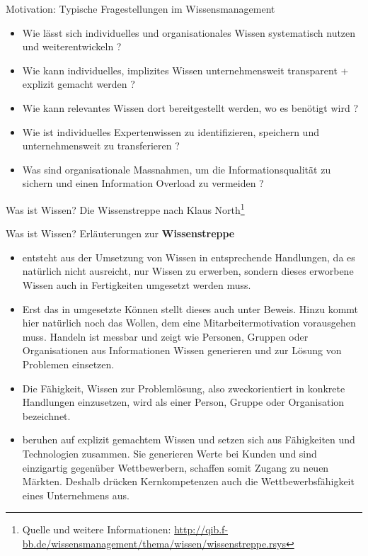 \documentclass[aspectratio=1610,onlymath]{beamer}
\begin{document}
\begin{frame}{Motivation: Typische Fragestellungen im Wissensmanagement}
\begin{itemize}
	\item Wie lässt sich \alert{individuelles und organisationales} Wissen \alert{systematisch} nutzen und weiterentwickeln ?
	\item Wie kann individuelles, implizites Wissen unternehmensweit \alert{transparent + explizit} gemacht werden ?
	\item Wie kann relevantes Wissen dort \alert{bereitgestellt} werden, wo es benötigt wird ?
	\item Wie ist individuelles Expertenwissen zu identifizieren, speichern und unternehmensweit zu \alert{transferieren} ?
	\item Was sind organisationale Massnahmen, um die \alert{Informationsqualität} zu sichern und einen Information Overload zu vermeiden ?
\end{itemize}
\end{frame}


\begin{frame}{Was ist Wissen?}
Die Wissenstreppe nach Klaus North\footnote{Quelle und weitere Informationen: \url{http://qib.f-bb.de/wissensmanagement/thema/wissen/wissenstreppe.rsys}}
\end{frame}


\begin{frame}{Was ist Wissen?}
Erläuterungen zur \textbf{Wissenstreppe}
\begin{itemize}
\item {} entsteht aus der Umsetzung von Wissen in entsprechende Handlungen, da es natürlich nicht ausreicht, nur Wissen zu erwerben, sondern dieses erworbene Wissen auch in Fertigkeiten umgesetzt werden muss.

\item Erst das in  umgesetzte Können stellt dieses auch unter Beweis. Hinzu kommt hier natürlich noch das Wollen, dem eine Mitarbeitermotivation vorausgehen muss. Handeln ist messbar und zeigt wie Personen, Gruppen oder Organisationen aus Informationen Wissen generieren und zur Lösung von Problemen einsetzen.

\item Die Fähigkeit, Wissen zur Problemlösung, also zweckorientiert in konkrete Handlungen einzusetzen, wird als  einer Person, Gruppe oder Organisation bezeichnet.

\item {} beruhen auf explizit gemachtem Wissen und setzen sich aus Fähigkeiten und Technologien zusammen. Sie generieren Werte bei Kunden und sind einzigartig gegenüber Wettbewerbern, schaffen somit Zugang zu neuen Märkten. Deshalb drücken Kernkompetenzen auch die \alert{Wettbewerbsfähigkeit} eines Unternehmens aus.
\end{itemize}
\end{frame}
\end{document}
